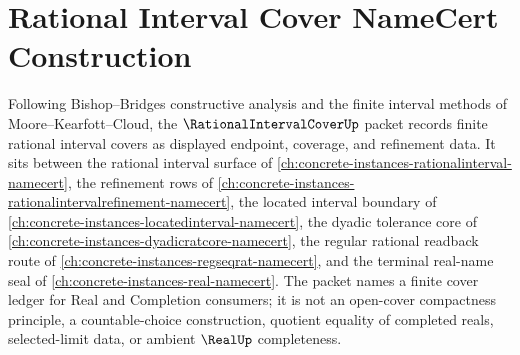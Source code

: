 \chapter{Rational Interval Cover NameCert Construction}
\label{ch:concrete-instances-rational-interval-cover-namecert}

Following Bishop--Bridges constructive analysis and the finite interval methods of Moore--Kearfott--Cloud, the $\RationalIntervalCoverUp$ packet records finite rational interval covers as displayed endpoint, coverage, and refinement data. It sits between the rational interval surface of \autoref{ch:concrete-instances-rationalinterval-namecert}, the refinement rows of \autoref{ch:concrete-instances-rationalintervalrefinement-namecert}, the located interval boundary of \autoref{ch:concrete-instances-locatedinterval-namecert}, the dyadic tolerance core of \autoref{ch:concrete-instances-dyadicratcore-namecert}, the regular rational readback route of \autoref{ch:concrete-instances-regseqrat-namecert}, and the terminal real-name seal of \autoref{ch:concrete-instances-real-namecert}. The packet names a finite cover ledger for Real and Completion consumers; it is not an open-cover compactness principle, a countable-choice construction, quotient equality of completed reals, selected-limit data, or ambient $\RealUp$ completeness.

